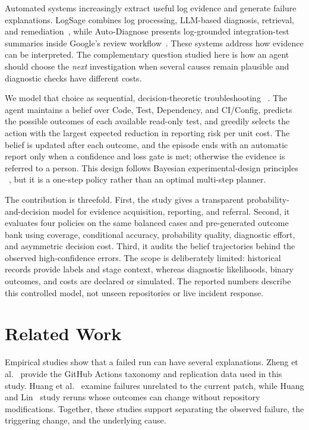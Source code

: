 \documentclass{article}
\begin{document}
Automated systems increasingly extract useful log evidence and generate
failure explanations. LogSage combines log processing, LLM-based diagnosis,
retrieval, and remediation~\cite{Xu2025LogSage}, while Auto-Diagnose presents
log-grounded integration-test summaries inside Google's review
workflow~\cite{Ziftci2026AutoDiagnose}. These systems address how evidence can
be interpreted. The complementary question studied here is how an agent should
choose the \emph{next} investigation when several causes remain plausible and
diagnostic checks have different costs.

We model that choice as sequential, decision-theoretic troubleshooting
~\cite{Heckerman1995Troubleshooting}. The agent maintains a belief over Code,
Test, Dependency, and CI/Config, predicts the possible outcomes of each
available read-only test, and greedily selects the action with the largest
expected reduction in reporting risk per unit cost. The belief is updated
after each outcome, and the episode ends with an automatic report only when a
confidence and loss gate is met; otherwise the evidence is referred to a
person. This design follows Bayesian experimental-design principles
~\cite{Rainforth2024ExperimentalDesign}, but it is a one-step policy rather
than an optimal multi-step planner.

The contribution is threefold. First, the study gives a transparent
probability-and-decision model for evidence acquisition, reporting, and
referral. Second, it evaluates four policies on the same balanced cases and
pre-generated outcome bank using coverage, conditional accuracy, probability
quality, diagnostic effort, and asymmetric decision cost. Third, it audits the
belief trajectories behind the observed high-confidence errors. The scope is
deliberately limited: historical records provide labels and stage context,
whereas diagnostic likelihoods, binary outcomes, and costs are declared or
simulated. The reported numbers describe this controlled model, not unseen
repositories or live incident response.

\section{Related Work}
\label{sec:related_work}

Empirical studies show that a failed run can have several explanations. Zheng
et al.~\cite{Zheng2026WorkflowFailures} provide the GitHub Actions taxonomy and
replication data used in this study. Huang et
al.~\cite{Huang2026UnrelatedFailures} examine failures unrelated to the current
patch, while Huang and Lin~\cite{Huang2026WorkflowReruns} study reruns whose
outcomes can change without repository modifications. Together, these studies
support separating the observed failure, the triggering change, and the
underlying cause.
\end{document}
